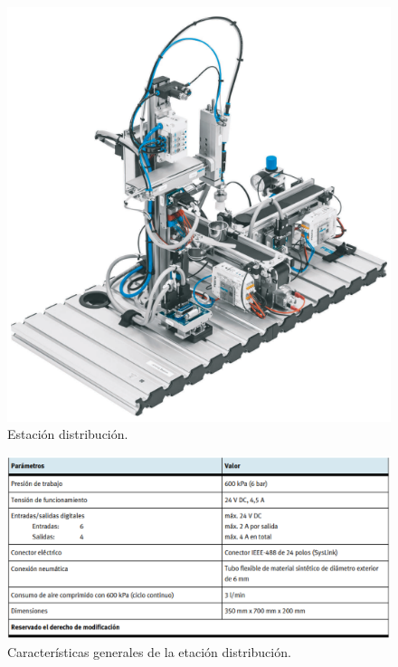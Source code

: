 \begin{figure} [h!]
  \begin{center}
    \includegraphics[width=11.5cm]{figs/estacion_distribucion_1}
  \end{center}
  \caption{\centering Estación distribución. \cite{estacion_distribucion}}
  \label{fig:estacion_distribucion_1}
\end{figure} 

\begin{figure} [h!]
  \begin{center}
    \includegraphics[width=15cm]{figs/estacion_distribucion_3}
  \end{center}
  \caption{\centering Características generales de la etación distribución. \cite{estacion_distribucion}}
  \label{fig:estacion_distribucion_3}
\end{figure} 

